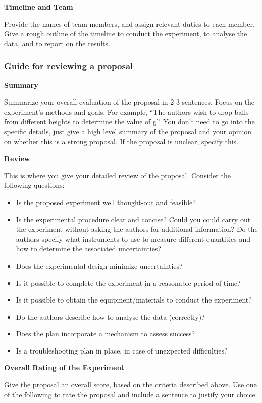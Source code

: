 \textbf{Timeline and Team}

Provide the names of team members, and assign relevant duties to each member. Give a rough outline of the timeline to conduct the experiment, to analyse the data, and to report on the results.

\subsubsection{Guide for reviewing a proposal}

\textbf{Summary}

Summarize your overall evaluation of the proposal in 2-3 sentences. Focus on the experiment's methods and goals. For example, ``The authors wish to drop balls from different heights to determine the value of g''. You don't need to go into the specific details, just give a high level summary of the proposal and your opinion on whether this is a strong proposal. If the proposal is unclear, specify this.

\textbf{Review}

This is where you give your detailed review of the proposal. Consider the following questions:

\begin{itemize}
\item Is the proposed experiment well thought-out and feasible?
\item Is the experimental procedure clear and concise? Could you could carry out the experiment without asking the authors for additional information? Do the authors specify what instruments to use to measure different quantities and how to determine the associated uncertainties?
\item Does the experimental design minimize uncertainties?
\item Is it possible to complete the experiment in a reasonable period of time?
\item Is it possible to obtain the equipment/materials to conduct the experiment?
\item Do the authors describe how to analyse the data (correctly)?
\item Does the plan incorporate a mechanism to assess success?
\item Is a troubleshooting plan in place, in case of unexpected difficulties?
\end{itemize}

\textbf{Overall Rating of the Experiment}

Give the proposal an overall score, based on the criteria described above. Use one of the following to rate the proposal and include a sentence to justify your choice.


